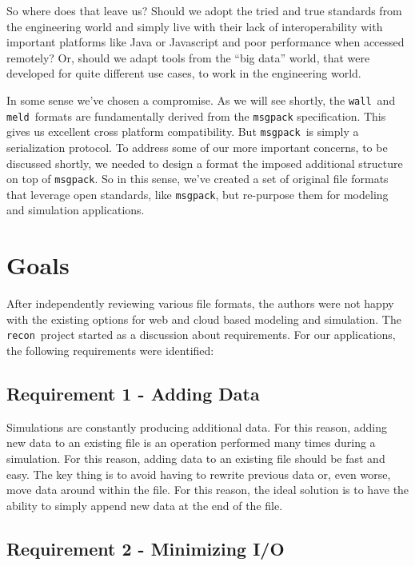 \documentclass[11pt,a4paper,twocolumn]{article}
\newcommand{\recon}{\texttt{recon}}
\newcommand{\wall}{\texttt{wall}}
\newcommand{\meld}{\texttt{meld}}
\newcommand{\msgpack}{\texttt{msgpack}}
\begin{document}
So where does that leave us?  Should we adopt the tried and true
standards from the engineering world and simply live with their lack
of interoperability with important platforms like Java or Javascript
and poor performance when accessed remotely?  Or, should we adapt
tools from the ``big data'' world, that were developed for quite
different use cases, to work in the engineering world.

In some sense we've chosen a compromise.  As we will see shortly, the
\wall\ and \meld\ formats are fundamentally derived from the
\msgpack\cite{msgpack} specification.  This gives us excellent cross
platform compatibility.  But \msgpack\ is simply a serialization
protocol.  To address some of our more important concerns, to be
discussed shortly, we needed to design a format the imposed additional
structure on top of \msgpack. So in this sense, we've created a set of
original file formats that leverage open standards, like \msgpack, but
re-purpose them for modeling and simulation applications.

\section{Goals}
\label{sec:goals}

After independently reviewing various file formats, the authors were
not happy with the existing options for web and cloud based modeling
and simulation.  The \recon\ project started as a discussion about
requirements.  For our applications, the following requirements were
identified:

\subsection{Requirement 1 - Adding Data}


Simulations are constantly producing additional data.  For this
reason, adding new data to an existing file is an operation performed
many times during a simulation.  For this reason, adding data to an
existing file should be fast and easy.  The key thing is to avoid having to
rewrite previous data or, even worse, move data around within the
file.  For this reason, the ideal solution is to have the ability to
simply append new data at the end of the file.

\subsection{Requirement 2 - Minimizing I/O}
\end{document}

